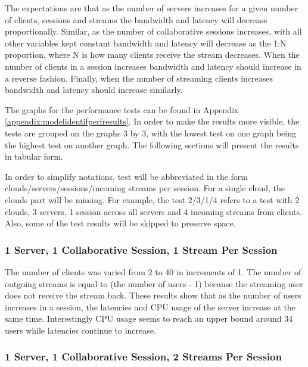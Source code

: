 The expectations are that as the number of servers increases for a given number of clients, sessions and streams the bandwidth and latency will decrease proportionally. Similar, as the number of collaborative sessions increases, with all other variables kept constant bandwidth and latency will decrease as the 1:N proportion, where N is how many clients receive the stream decreases. When the number of clients in a session increases bandwidth and latency should increase in a reverse fashion. Finally, when the number of streaming clients increases bandwidth and latency should increase similarly.

The graphs for the performance tests can be found in Appendix \ref{appendix:modelidentifperfresults}. In order to make the results more visible, the tests are grouped on the graphs 3 by 3, with the lowest test on one graph being the highest test on another graph. The following sections will present the results in tabular form.

In order to simplify notations, test will be abbreviated in the form clouds/servers/sessions/incoming streams per session. For a single cloud, the clouds part will be missing. For example, the test 2/3/1/4 refers to a test with 2 clouds, 3 servers, 1 session across all servers and 4 incoming streams from clients. Also, some of the test results will be skipped to preserve space.

\subsubsection{1 Server, 1 Collaborative Session, 1 Stream Per Session}
\label{sec:1serv_1sess_1str}

The number of clients was varied from 2 to 40 in increments of 1. The number of outgoing streams is equal to (the number of users - 1) because the streaming user does not receive the stream back. These results show that as the number of users increases in a session, the latencies and CPU usage of the server increase at the same time. Interestingly CPU usage seems to reach an upper bound around 34 users while latencies continue to increase.

\subsubsection{1 Server, 1 Collaborative Session, 2 Streams Per Session}
\label{sec:1serv_1sess_2str180}

